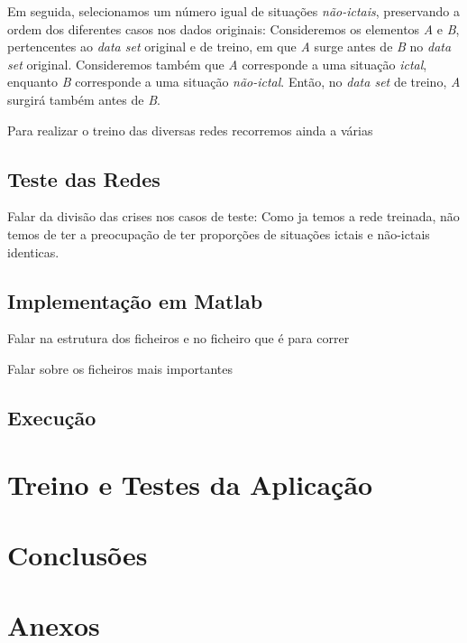 \documentclass{article}
\begin{document}
Em seguida, selecionamos um número igual de situações \emph{não-ictais}, preservando a ordem dos diferentes casos nos dados originais: Consideremos os elementos \emph{A} e \emph{B}, pertencentes ao \emph{data set} original e de treino, em que \emph{A} surge antes de \emph{B} no \emph{data set} original. Consideremos também que \emph{A} corresponde a uma situação \emph{ictal}, enquanto \emph{B} corresponde a uma situação \emph{não-ictal}. Então, no \emph{data set} de treino, \emph{A} surgirá também antes de \emph{B}.

Para realizar o treino das diversas redes recorremos ainda a várias 


\subsection{Teste das Redes}

Falar da divisão das crises nos casos de teste: Como ja temos a rede treinada, não temos de ter a preocupação de ter proporções de situações ictais e não-ictais identicas.


\subsection{Implementação em Matlab}

Falar na estrutura dos ficheiros e no ficheiro que é para correr

Falar sobre os ficheiros mais importantes





\subsection{Execução}


\pagebreak

\section{Treino e Testes da Aplicação}



\pagebreak

\section{Conclusões}


\pagebreak

\section{Anexos}
\end{document}
